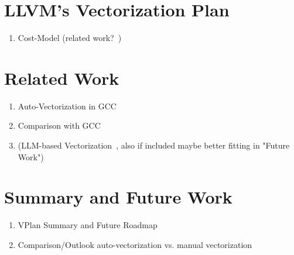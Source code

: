 \documentclass[sigplan,11pt,nonacm]{acmart}
\begin{document}


\section{LLVM's Vectorization Plan}
\label{sec:vplan}
\begin{enumerate}
  \item Cost-Model (related work?~\cite{POHL2020102106})
\end{enumerate}




\section{Related Work}
\label{sec:relatedwork}
\begin{enumerate}
  \item Auto-Vectorization in GCC~\cite{autovecoptgcc, vecoptgcc}
  \item Comparison with GCC~\cite{gccllvmveccomp,10.1155/2021/3264624}
  \item (LLM-based Vectorization~\cite{taneja2024llmvectorizerllmbasedverifiedloop}, also if included maybe better fitting in "Future Work")
\end{enumerate}




\section{Summary and Future Work}
\label{sec:summary}
\begin{enumerate}
  \item VPlan Summary and Future Roadmap~\cite{llvmvplan}
  \item Comparison/Outlook auto-vectorization vs. manual vectorization~\cite{10.1155/2021/3264624,9802745}
\end{enumerate}




\end{document}
